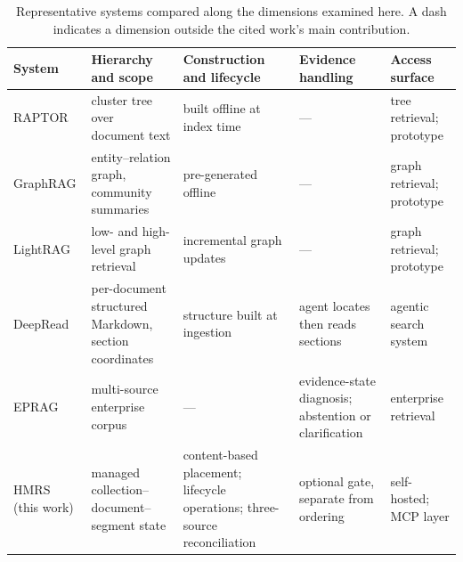 \begin{table}[!t]
\centering
\small
\setlength{\tabcolsep}{3.5pt}
\renewcommand{\arraystretch}{1.02}
\caption{Representative systems compared along the dimensions examined here.
A dash indicates a dimension outside the cited work's main contribution.}
\label{tab:related-comparison}
\begin{tabular}{@{}>{\raggedright\arraybackslash}p{}>{\raggedright\arraybackslash}p{}>{\raggedright\arraybackslash}p{}>{\raggedright\arraybackslash}p{}>{\raggedright\arraybackslash}p{}@{}}
\toprule
System & Hierarchy and scope & Construction and lifecycle & Evidence handling & Access surface\\
\midrule
RAPTOR \citep{raptor} & cluster tree over document text & built offline at index time & --- & tree retrieval; prototype\\
GraphRAG \citep{graphrag} & entity--relation graph, community summaries & pre-generated offline & --- & graph retrieval; prototype\\
LightRAG \citep{lightrag} & low- and high-level graph retrieval & incremental graph updates & --- & graph retrieval; prototype\\
DeepRead \citep{deepread} & per-document structured Markdown, section coordinates & structure built at ingestion & agent locates then reads sections & agentic search system\\
EPRAG \citep{kinalioglu-kbs-eprag-2026} & multi-source enterprise corpus & --- & evidence-state diagnosis; abstention or clarification & enterprise retrieval\\
HMRS (this work) & managed collection--document--segment state & content-based placement; lifecycle operations; three-source reconciliation & optional gate, separate from ordering & self-hosted; MCP layer\\
\bottomrule
\end{tabular}
\end{table}

